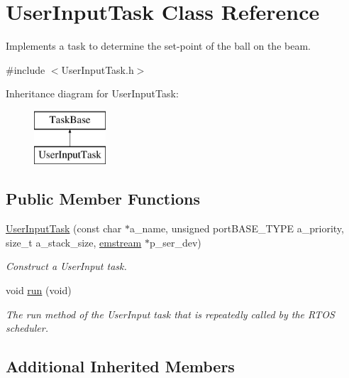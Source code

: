 \hypertarget{class_user_input_task}{}\section{User\+Input\+Task Class Reference}
\label{class_user_input_task}


Implements a task to determine the set-\/point of the ball on the beam.  




{\ttfamily \#include $<$User\+Input\+Task.\+h$>$}

Inheritance diagram for User\+Input\+Task\+:\begin{figure}[H]
\begin{center}
\leavevmode
\includegraphics[height=2.000000cm]{class_user_input_task}
\end{center}
\end{figure}
\subsection*{Public Member Functions}
\begin{DoxyCompactItemize}
\item 
\mbox{\hyperlink{class_user_input_task_a46e07c6b7e8d143761f8a747c80a73f3}{User\+Input\+Task}} (const char $\ast$a\+\_\+name, unsigned port\+B\+A\+S\+E\+\_\+\+T\+Y\+PE a\+\_\+priority, size\+\_\+t a\+\_\+stack\+\_\+size, \mbox{\hyperlink{classemstream}{emstream}} $\ast$p\+\_\+ser\+\_\+dev)
\begin{DoxyCompactList}\small\item\em Construct a User\+Input task. \end{DoxyCompactList}\item 
void \mbox{\hyperlink{class_user_input_task_a03666bddf33829bd1eb0dfcfd7f7075b}{run}} (void)
\begin{DoxyCompactList}\small\item\em The run method of the User\+Input task that is repeatedly called by the R\+T\+OS scheduler. \end{DoxyCompactList}\end{DoxyCompactItemize}
\subsection*{Additional Inherited Members}


